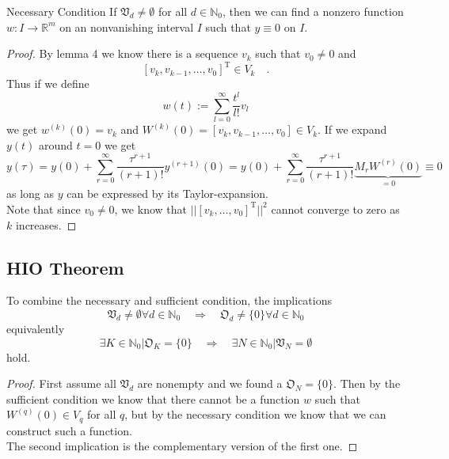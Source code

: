 \begin{proposition}{Necessary Condition}{}
	If $\mathfrak{V}_d\neq \emptyset $ for all $d\in\mathbb{N}_0$, then we can find a nonzero function 
	$w:I\to\mathbb{R}^m$ on an nonvanishing interval $I$ such that $y\equiv 0$ on $I$.
\end{proposition}
\begin{proof}
	By lemma 4 we know there is a sequence $v_k$ such that $v_0 \neq 0$ and
	\begin{equation}
	\left[ v_k , v_{k-1},\ldots , v_0\right]^\text{T} \in V_k \quad .
	\end{equation}
	Thus if we define
	\begin{equation}
	w(t):= \sum\limits_{l=0}^\infty \frac{t^l}{l!} v_l
	\end{equation}
	we get $w^{(k)}(0)=v_k$ and $W^{(k)}(0)=[v_k,v_{k-1},\ldots,v_0]\in V_k$. If we expand $y(t)$ around 
	$t=0$ we get 
	\begin{equation}
	y(\tau) = y(0) + \sum\limits_{r=0}^\infty \frac{\tau^{r+1}}{(r+1)!} y^{(r+1)}(0)  
	= y(0) + \sum\limits_{r=0}^\infty \frac{\tau^{r+1}}{(r+1)!} \underbrace{M_r W^{(r)}(0)}_{=0} \equiv 0
	\end{equation}
	as long as $y$ can be expressed by its Taylor-expansion. \\
	
	Note that since $v_0\neq 0$, we know that $||[v_k,\ldots,v_0]^\text{T}||^2$ cannot converge to zero as 
	$k$ increases.  
\end{proof}	

\clearpage

\subsection{HIO Theorem}
\begin{proposition}{}{}
	To combine the necessary and sufficient condition, the implications
	\begin{equation}
	\mathfrak{V}_d \neq \emptyset \forall d\in\mathbb{N}_0 \quad \Longrightarrow \quad \mathfrak{O}_d 
	\neq \{0\}\forall d\in\mathbb{N}_0
	\end{equation}
	equivalently
	\begin{equation}
	\exists K \in\mathbb{N}_0 \big| \mathfrak{O}_K = \{0\} \quad \Longrightarrow \quad 
	\exists N \in\mathbb{N}_0 \big| \mathfrak{V}_N = \emptyset
	\end{equation}
	hold.
\end{proposition}
\begin{proof}
	First assume all $\mathfrak{V}_d$ are nonempty and we found a $\mathfrak{O}_N=\{0\}$. Then by the sufficient 
	condition we know that there cannot be a function $w$ such that $W^{(q)}(0)\in V_q$ for all $q$, but by the 
	necessary condition we know that we can construct such a function.\\
	
	The second implication is the complementary version of the first one.
\end{proof}

